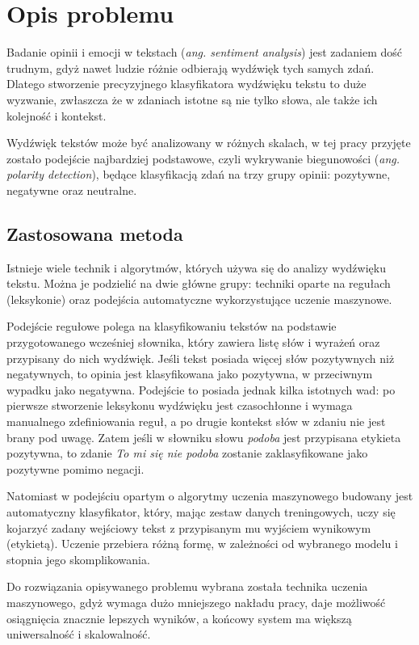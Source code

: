 \chapter{Opis problemu}
\label{cha:opis}

Badanie opinii i emocji w tekstach (\textit{ang. sentiment analysis}) jest zadaniem dość trudnym, gdyż nawet ludzie różnie odbierają wydźwięk tych samych zdań. Dlatego stworzenie precyzyjnego klasyfikatora wydźwięku tekstu to duże wyzwanie, zwłaszcza że w zdaniach istotne są nie tylko słowa, ale także ich kolejność i kontekst. 

Wydźwięk tekstów może być analizowany w różnych skalach, w tej pracy przyjęte zostało podejście najbardziej podstawowe, czyli wykrywanie biegunowości (\textit{ang. polarity detection}), będące klasyfikacją zdań na trzy grupy opinii: pozytywne, negatywne oraz neutralne. 

\section{Zastosowana metoda}
\label{sec:technika}
Istnieje wiele technik i algorytmów, których używa się do analizy wydźwięku tekstu. Można je podzielić na dwie główne grupy: techniki oparte na regułach (leksykonie) oraz podejścia automatyczne wykorzystujące uczenie maszynowe. 

Podejście regułowe polega na klasyfikowaniu tekstów na podstawie przygotowanego wcześniej słownika, który zawiera listę słów i wyrażeń oraz przypisany do nich wydźwięk\cite{techniques}. Jeśli tekst posiada więcej słów pozytywnych niż negatywnych, to opinia jest klasyfikowana jako pozytywna, w przeciwnym wypadku jako negatywna. Podejście to posiada jednak kilka istotnych wad: po pierwsze stworzenie leksykonu wydźwięku jest czasochłonne i wymaga manualnego zdefiniowania reguł, a po drugie kontekst słów w zdaniu nie jest brany pod uwagę. Zatem jeśli w słowniku słowu \textit{podoba} jest przypisana etykieta pozytywna, to zdanie \textit{To mi się nie podoba} zostanie zaklasyfikowane jako pozytywne pomimo negacji.  

Natomiast w podejściu opartym o algorytmy uczenia maszynowego budowany jest automatyczny klasyfikator, który, mając zestaw danych treningowych, uczy się kojarzyć zadany wejściowy tekst z przypisanym mu wyjściem wynikowym (etykietą)\cite{techniques}. Uczenie przebiera różną formę, w zależności od wybranego modelu i stopnia jego skomplikowania. 

Do rozwiązania opisywanego problemu wybrana została technika uczenia maszynowego, gdyż wymaga dużo mniejszego nakładu pracy, daje możliwość osiągnięcia znacznie lepszych wyników, a końcowy system ma większą uniwersalność i skalowalność.

